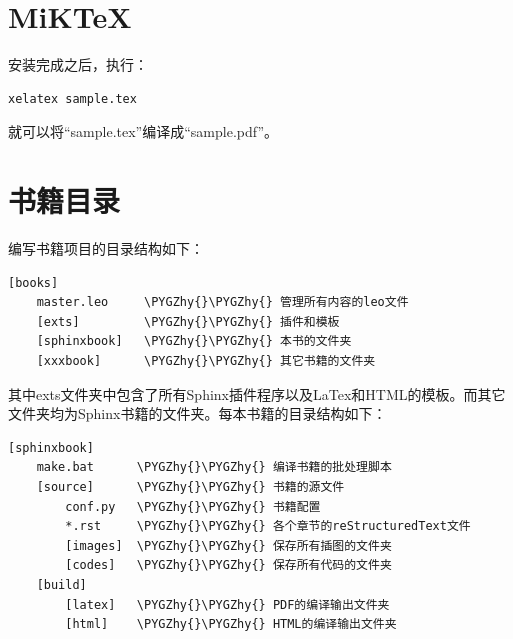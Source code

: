 \documentclass[letterpaper,10pt]{sphinxmanual}
\def\PYGZhy{\char`\-}
\begin{document}
\section{MiKTeX}
\label{setup:miktex}
安装完成之后，执行：

\begin{Verbatim}[commandchars=\\\{\}]
xelatex sample.tex
\end{Verbatim}

就可以将“sample.tex”编译成“sample.pdf”。


\section{书籍目录}
\label{setup:sec-book-folder}\label{setup:id2}\label{setup:-sec-book-folder}
编写书籍项目的目录结构如下：

\begin{Verbatim}[commandchars=\\\{\}]
[books]
    master.leo     \PYGZhy{}\PYGZhy{} 管理所有内容的leo文件
    [exts]         \PYGZhy{}\PYGZhy{} 插件和模板
    [sphinxbook]   \PYGZhy{}\PYGZhy{} 本书的文件夹
    [xxxbook]      \PYGZhy{}\PYGZhy{} 其它书籍的文件夹
\end{Verbatim}

其中exts文件夹中包含了所有Sphinx插件程序以及LaTex和HTML的模板。而其它文件夹均为Sphinx书籍的文件夹。每本书籍的目录结构如下：

\begin{Verbatim}[commandchars=\\\{\}]
[sphinxbook]
    make.bat      \PYGZhy{}\PYGZhy{} 编译书籍的批处理脚本
    [source]      \PYGZhy{}\PYGZhy{} 书籍的源文件
        conf.py   \PYGZhy{}\PYGZhy{} 书籍配置
        *.rst     \PYGZhy{}\PYGZhy{} 各个章节的reStructuredText文件
        [images]  \PYGZhy{}\PYGZhy{} 保存所有插图的文件夹
        [codes]   \PYGZhy{}\PYGZhy{} 保存所有代码的文件夹
    [build]
        [latex]   \PYGZhy{}\PYGZhy{} PDF的编译输出文件夹
        [html]    \PYGZhy{}\PYGZhy{} HTML的编译输出文件夹
\end{Verbatim}
\end{document}
